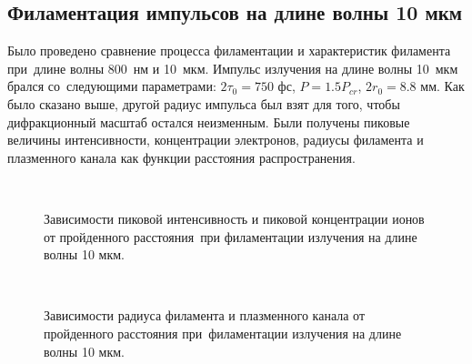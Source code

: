 \subsection{Филаментация импульсов на длине волны 10 мкм}

Было проведено сравнение процесса филаментации и характеристик филамента \\ при~длине волны 800~нм и 10~мкм.
Импульс излучения на длине волны 10~мкм брался со~следующими параметрами: $2 \tau_0 = 750 \textrm{ фс}$, $P = 1.5P_{cr}$, $2 r_0 = 8.8 \textrm{ мм}$.
Как было сказано выше, другой радиус импульса был взят для того, чтобы дифракционный масштаб остался неизменным.
Были получены пиковые величины интенсивности, концентрации электронов, радиусы филамента и плазменного канала как функции расстояния распространения.


\begin{figure}[H]
    \begin{center}
        \begin{minipage}{\minipagewidthtwo}
        \end{minipage}
        \hfill
        \begin{minipage}{\minipagewidthtwo}
        \end{minipage}
        \\[1ex]
        \caption{Зависимости пиковой интенсивность и пиковой концентрации ионов от пройденного расстояния~при филаментации излучения на длине волны 10 мкм.}
        \label{fig:Pulses10000INe}
    \end{center}
\end{figure}



\begin{figure}[H]
    \begin{center}
        \begin{minipage}{\minipagewidthtwo}
        \end{minipage}
        \hfill
        \begin{minipage}{\minipagewidthtwo}
        \end{minipage}
        \\[1ex]
        \caption{Зависимости радиуса филамента и плазменного канала от пройденного расстояния при~филаментации излучения на длине волны 10 мкм.}
        \label{fig:Pulses10000RFilPl}
    \end{center}
\end{figure}

